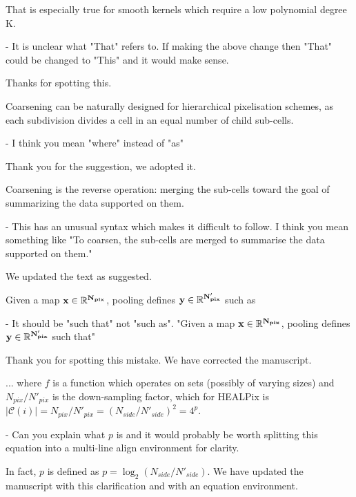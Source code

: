 \documentclass[12pt,a4paper]{article}
\newcommand{\nati}[1]{{\color[rgb]{.1,.6,.1}{NP: #1}}}
\newcommand{\todo}[1]{{\color[rgb]{.6,.1,.6}{TODO: #1}}}
\newcommand{\1}{\b{1}}              %
\newcommand{\0}{\b{0}}              %
\begin{document}
\begin{mdframed}[style=comment]
That is especially true for smooth kernels which require a low polynomial degree K.

- It is unclear what "That" refers to. If making the above change then "That" could be changed to "This" and it would make sense.
\end{mdframed}
Thanks for spotting this.

\begin{mdframed}[style=comment]
Coarsening can be naturally designed for hierarchical pixelisation schemes, as each subdivision divides a cell in an equal number of child sub-cells.

- I think you mean "where" instead of "as"
\end{mdframed}
Thank you for the suggestion, we adopted it.

\begin{mdframed}[style=comment]
Coarsening is the reverse operation: merging the sub-cells toward the goal of summarizing the data supported on them.

- This has an unusual syntax which makes it difficult to follow. I think you mean something like "To coarsen, the sub-cells are merged to summarise the data supported on them."
\end{mdframed}
We updated the text as suggested.

\begin{mdframed}[style=comment]
Given a map $\bf{x}\in\mathbb{R}^{N_{pix}}$, pooling defines $\bf{y}\in\mathbb{R}^{N'_{pix}}$ such as

- It should be "such that" not "such as". "Given a map $\bf{x}\in\mathbb{R}^{N_{pix}}$, pooling defines $\bf{y}\in\mathbb{R}^{N'_{pix}}$ such that"
\end{mdframed}
Thank you for spotting this mistake. We have corrected the manuscript.

\begin{mdframed}[style=comment]
... where $f$ is a function which operates on sets (possibly of varying sizes) and $N_{pix}/N'_{pix}$ is the down-sampling factor, which for HEALPix is $|\mathcal{C}(i)| = N_{pix}/N'_{pix} = (N_{side} / N'_{side})^2 = 4^p$.

- Can you explain what $p$ is and it would probably be worth splitting this equation into a multi-line align environment for clarity.
\end{mdframed}
In fact, $p$ is defined as $p=\log_2(N_{side} / N'_{side})$. We have updated the manuscript with this clarification and with an equation environment.
\end{document}
